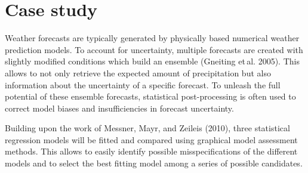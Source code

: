 \documentclass[twoside]{report}
\begin{document}

\maketitle



\section{Case study}


Weather forecasts are typically generated by physically based numerical weather
prediction models. To account for uncertainty, multiple forecasts are created
with slightly modified conditions which build an ensemble (Gneiting et\,al.
2005). This allows to not only retrieve the expected amount of precipitation
but also information about the uncertainty of a specific forecast.
To unleash the full potential of these ensemble forecasts, statistical
post-processing is often used to correct model biases and insufficiencies in
forecast uncertainty.

Building upon the work of Messner, Mayr, and Zeileis (2010), three statistical
regression models will be fitted and compared using
graphical model assessment methods.
This allows to easily identify possible misspecifications of the different
models and to select the best fitting model among a series of possible candidates.


\end{document}

